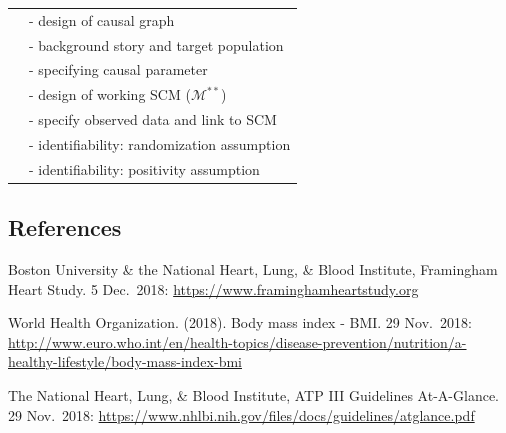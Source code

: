 \documentclass[]{article}
\begin{document}
\begin{table}[h!]
\begin{tabular}{|l|l|}
      & - design of causal graph \\
      & - background story and target population \\
      & - specifying causal parameter \\
      & - design of working SCM ($\mathcal{M}^{**}$) \\
      & - specify observed data and link to SCM \\
      & - identifiability: randomization assumption \\
      & - identifiability: positivity assumption \\ \hline
  \end{tabular}
\end{table}

\hypertarget{references}{%
\subsection{References}\label{references}}

Boston University \& the National Heart, Lung, \& Blood Institute,
Framingham Heart Study. 5 Dec.~2018:
\url{https://www.framinghamheartstudy.org}

World Health Organization. (2018). Body mass index - BMI. 29 Nov.~2018:
\url{http://www.euro.who.int/en/health-topics/disease-prevention/nutrition/a-healthy-lifestyle/body-mass-index-bmi}

The National Heart, Lung, \& Blood Institute, ATP III Guidelines
At-A-Glance. 29 Nov.~2018:
\url{https://www.nhlbi.nih.gov/files/docs/guidelines/atglance.pdf}
\end{document}
